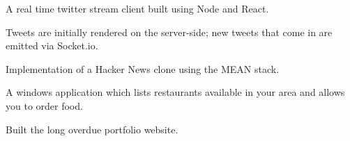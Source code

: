 \documentclass[a4paper]{resume}
\begin{document}
\begin{minipage}[t]{0.66\textwidth}

\begin{tightitemize}
\item A real time twitter stream client built using Node and React.
\item Tweets are initially rendered on the server-side; new tweets that come in are emitted via Socket.io.
\end{tightitemize}

\sectionspace %




\begin{tightitemize}
\item Implementation of a Hacker News clone using the MEAN stack.
\end{tightitemize}

\sectionspace %




\begin{tightitemize}
\item A windows application which lists restaurants available in your area and allows you to order food.
\end{tightitemize}

\sectionspace %




\begin{tightitemize}
\item Built the long overdue portfolio website.
\end{tightitemize}

\sectionspace %




\end{minipage}
\end{document}
